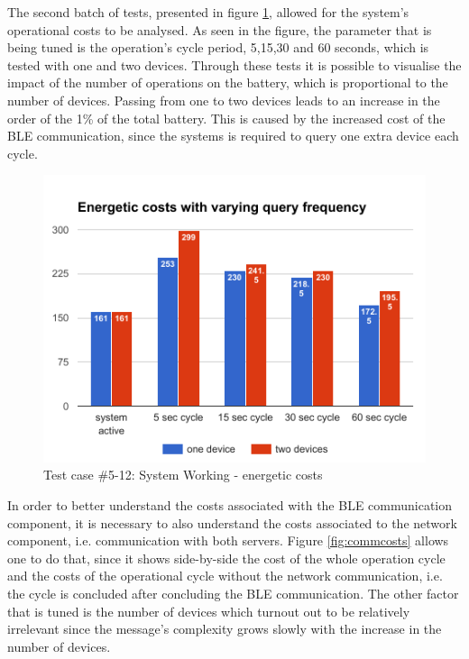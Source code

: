\documentclass[a4paper]{IEEEtran}
\begin{document}
 
The second batch of tests, presented in figure \ref{fig:syswork}, allowed for the system's operational costs to be analysed. As seen in the figure, the parameter that is being tuned is the operation's cycle period, 5,15,30 and 60 seconds, which is tested with one and two devices.  
Through these tests it is possible to visualise the impact of the number of operations on the battery, which is proportional to the number of devices. Passing from one to two devices leads to an increase in the order of the 1\% of the total battery. This is caused by the increased cost of the BLE communication, since the systems is required to query one extra device each cycle. 
 
 
\begin{figure} 
\centering 
\includegraphics[width=1\linewidth]{figures/system-working.png} 
\caption[Test case \#5-12: System Working - energetic costs]{Test case \#5-12: System Working - energetic costs} 
\label{fig:syswork} 
\end{figure} 
 
 
In order to better understand the costs associated with the BLE communication component, it is necessary to also understand the costs associated to the network component, i.e. communication with both servers. Figure \ref{fig:commcosts} allows one to do that, since it shows side-by-side the cost of the whole operation cycle and the costs of the operational cycle without the network communication, i.e. the cycle is concluded after concluding the BLE communication. The other factor that is tuned is the number of devices which turnout out to be relatively irrelevant since the message's complexity grows slowly with the increase in the number of devices.  
 
\end{document}
